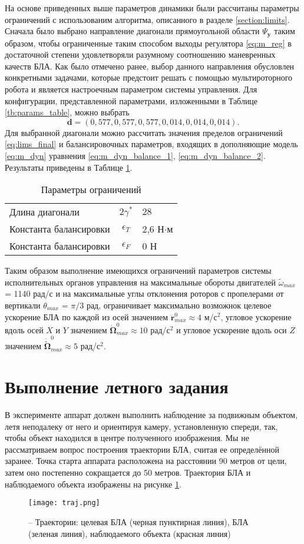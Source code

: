 На основе приведенных выше параметров динамики были рассчитаны параметры ограничений с использованим алгоритма, описанного в разделе \ref{section:limits}. Сначала было выбрано направление диагонали прямоугольной области $\Psi_{\boldsymbol{y}}$ таким образом, чтобы ограниченные таким способом выходы регулятора \eqref{eq:m_reg} в достаточной степени удовлетворяли разумному соотношению маневренных качеств БЛА. Как было отмечено ранее, выбор данного направления обусловлен конкретными задачами, которые предстоит решать с помощью мультироторного робота и является настроечным параметром системы управления. Для конфигурации, представленной параметрами, изложенными в Таблице \ref{tb:params_table}, можно выбрать
$$\bm d = (0,577, 0,577, 0,577, 0,014, 0,014, 0,014).$$
Для выбранной диагонали можно рассчитать значения пределов ограничений \eqref{eq:lims_final} и балансировочных параметров, входящих в дополняющие модель \eqref{eq:m_dyn} уравнения \ref{eq:m_dyn_balance_1}, \ref{eq:m_dyn_balance_2}. Результаты приведены в Таблице \ref{tb:lims_table}.
\begin{table}[h!]
	\centering
	\caption{Параметры ограничений}\label{tb:lims_table} 
	\begin{tabular}{lcl}
		\hline	
		Длина диагонали & $2\gamma^*$ & $28$ \\
		Константа балансировки & $\epsilon_T$ &2,6 Н$\cdot$м \\
		Константа балансировки & $\epsilon_F$ &0 Н\\
		\hline
	\end{tabular}
\end{table}
Таким образом выполнение имеющихся ограничений параметров системы исполнительных органов управления на максимальные обороты двигателей
$\tilde \omega_{max}$ = 1140 рад/с
и на максимальные углы отклонения роторов с пропелерами от вертикали
$\theta_{max}$ = ${\pi}/{3}$ рад,
ограничивает максимально возможнок целевое ускорение БЛА по каждой из осей значением
$\ddot {\bm r}_{max}^0 \approx 4$ м/с$^2$,
угловое ускорение вдоль осей $X$ и $Y$ значением
$\dot {\bm \Omega}_{max}^0 \approx 10$ рад/с$^2$
и угловое ускорение вдоль оси $Z$ значением
$\dot {\tilde{\bm \Omega}}_{max}^0 \approx 5$ рад/с$^2$.

\section{Выполнение летного задания}
В эксперименте аппарат должен выполнить наблюдение за подвижным объектом, летя неподалеку от него и ориентируя камеру, установленную спереди, так, чтобы объект находился в центре полученного изображения.
Мы не рассматриваем вопрос построения траектории БЛА, считая ее определённой заранее.
Точка старта аппарата расположена на расстоянии 90 метров от цели, затем оно постепенно сокращается до 50 метров.
Траектория БЛА и наблюдаемого объекта изображены на рисунке \ref{fig:mau_traj}.
\begin{figure}[h!]
	\centering
	\texttt{[image: traj.png]}
	\caption{ -- Траектории: целевая БЛА (черная пунктирная линия), БЛА (зеленая линия), наблюдаемого объекта (красная линия)}
	\label{fig:mau_traj}
\end{figure}

